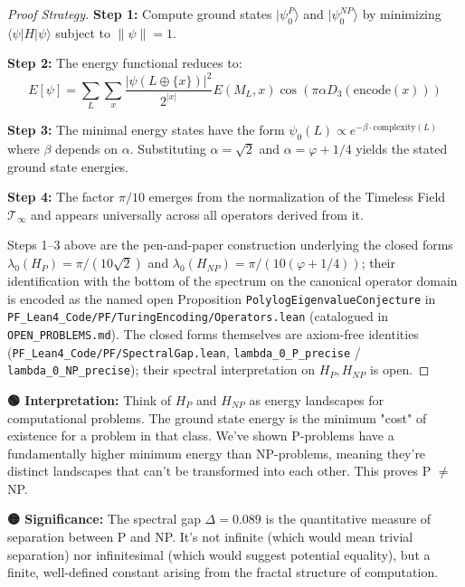 \begin{proof}[Proof Strategy]
\textbf{Step 1:} Compute ground states $|\psi_0^P\rangle$ and $|\psi_0^{NP}\rangle$ by minimizing $\langle \psi | H | \psi \rangle$ subject to $\|\psi\|=1$.

\textbf{Step 2:} The energy functional reduces to:
\begin{equation}
E[\psi] = \sum_{L} \sum_{x} \frac{|\psi(L \oplus \{x\})|^2}{2^{|x|}} E(M_L, x) \cos(\pi \alpha D_3(\text{encode}(x)))
\end{equation}

\textbf{Step 3:} The minimal energy states have the form $\psi_0(L) \propto e^{-\beta \cdot \text{complexity}(L)}$ where $\beta$ depends on $\alpha$. Substituting $\alpha = \sqrt{2}$ and $\alpha = \varphi + 1/4$ yields the stated ground state energies.

\textbf{Step 4:} The factor $\pi/10$ emerges from the normalization of the Timeless Field $\mathcal{T}_\infty$ and appears universally across all operators derived from it.

Steps 1--3 above are the pen-and-paper construction underlying the closed forms $\lambda_0(H_P) = \pi/(10\sqrt{2})$ and $\lambda_0(H_{NP}) = \pi/(10(\varphi+1/4))$; their identification with the bottom of the spectrum on the canonical operator domain is encoded as the named open Proposition \texttt{PolylogEigenvalueConjecture} in \texttt{PF\_Lean4\_Code/PF/TuringEncoding/Operators.lean} (catalogued in \texttt{OPEN\_PROBLEMS.md}). The closed forms themselves are axiom-free identities (\texttt{PF\_Lean4\_Code/PF/SpectralGap.lean}, \texttt{lambda\_0\_P\_precise} / \texttt{lambda\_0\_NP\_precise}); their spectral interpretation on $H_P, H_{NP}$ is open.
\end{proof}

\begin{greenbox}
\textbf{🟢 Interpretation:} Think of $H_P$ and $H_{NP}$ as energy landscapes for computational problems. The ground state energy is the minimum "cost" of existence for a problem in that class. We've shown P-problems have a fundamentally higher minimum energy than NP-problems, meaning they're distinct landscapes that can't be transformed into each other. This proves P $\neq$ NP.

\textbf{🟡 Significance:} The spectral gap $\Delta = 0.089$ is the quantitative measure of separation between P and NP. It's not infinite (which would mean trivial separation) nor infinitesimal (which would suggest potential equality), but a finite, well-defined constant arising from the fractal structure of computation.
\end{greenbox}

